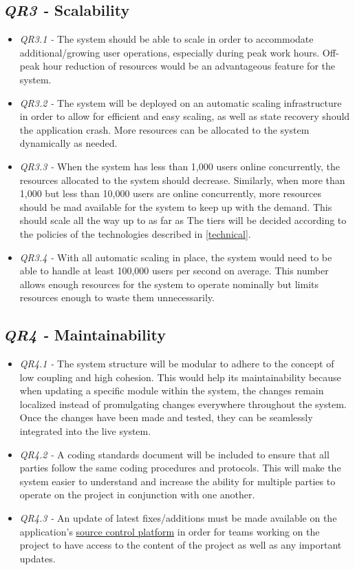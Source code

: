 \documentclass[11pt]{article}
\begin{document}
\subsection{\textit{QR3 -} Scalability}
\begin{itemize}
    \item \textit{QR3.1 -} The system should be able to scale in order to accommodate additional/growing user operations, especially during peak work hours. Off-peak hour reduction of resources would be an advantageous feature for the system.
    \item \textit{QR3.2 -} The system will be deployed on an automatic scaling infrastructure in order to allow for efficient and easy scaling, as well as state recovery should the application crash. More resources can be allocated to the system dynamically as needed.
    \item \textit{QR3.3 -} When the system has less than 1,000 users online concurrently, the resources allocated to the system should decrease. Similarly, when more than 1,000 but less than 10,000 users are online concurrently, more resources should be mad available for the system to keep up with the demand. This should scale all the way up to as far as The tiers will be decided according to the policies of the technologies described in \ref{technical}.
    \item \textit{QR3.4 -} With all automatic scaling in place, the system would need to be able to handle at least 100,000 users per second on average. This number allows enough resources for the system to operate nominally but limits resources enough to waste them unnecessarily.
\end{itemize}

\subsection{\textit{QR4 -} Maintainability}
\begin{itemize}
    \item \textit{QR4.1 -} The system structure will be modular to adhere to the concept of low coupling and high cohesion. This would help its maintainability because when updating a specific module within the system, the changes remain localized instead of promulgating changes everywhere throughout the system. Once the changes have been made and tested, they can be seamlessly integrated into the live system.
    \item \textit{QR4.2 -} A coding standards document will be included to ensure that all parties follow the same coding procedures and protocols. This will make the system easier to understand and increase the ability for multiple parties to operate on the project in conjunction with one another.
    \item \textit{QR4.3 -} An update of latest fixes/additions must be made available on the application's \href{https://github.com/KyleGaunt/ContractInstructionModule}{source control platform} in order for teams working on the project to have access to the content of the project as well as any important updates.
\end{itemize}
\end{document}
